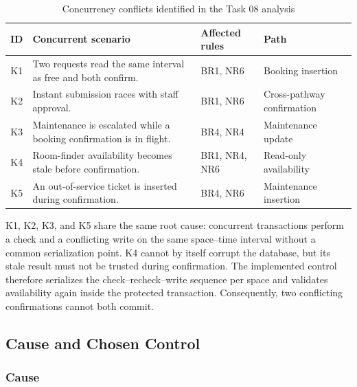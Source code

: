 \begin{table}[htbp]
    \centering
    \small
    \renewcommand{\arraystretch}{1.15}
    \begin{tabularx}{\textwidth}{c
        >{\RaggedRight\arraybackslash}p{}
        >{\RaggedRight\arraybackslash}p{}
        >{\RaggedRight\arraybackslash}X}
        \toprule
        \textbf{ID} & \textbf{Concurrent scenario} &
        \textbf{Affected rules} & \textbf{Path} \\
        \midrule
        K1 & Two requests read the same interval as free and both confirm. &
        BR1, NR6 & Booking insertion \\
        K2 & Instant submission races with staff approval. &
        BR1, NR6 & Cross-pathway confirmation \\
        K3 & Maintenance is escalated while a booking confirmation is in flight. &
        BR4, NR4 & Maintenance update \\
        K4 & Room-finder availability becomes stale before confirmation. &
        BR1, NR4, NR6 & Read-only availability \\
        K5 & An out-of-service ticket is inserted during confirmation. &
        BR4, NR6 & Maintenance insertion \\
        \bottomrule
    \end{tabularx}
    \caption{Concurrency conflicts identified in the Task 08 analysis}
    \label{tab:conflicts}
\end{table}
\FloatBarrier

K1, K2, K3, and K5 share the same root cause: concurrent transactions perform
a check and a conflicting write on the same space--time interval without a
common serialization point. K4 cannot by itself corrupt the database, but its
stale result must not be trusted during confirmation. The implemented control
therefore serializes the check--recheck--write sequence per space and validates
availability again inside the protected transaction. Consequently, two
conflicting confirmations cannot both commit.

\subsection{Cause and Chosen Control}

\subsubsection{Cause}

